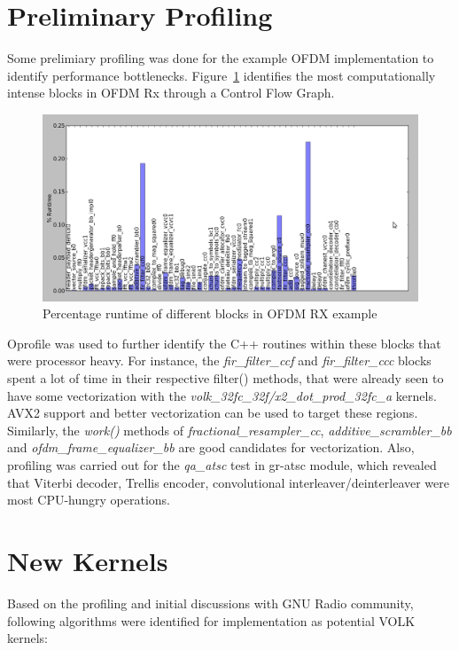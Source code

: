 \documentclass[a4paper,12pt,oneside]{article}
\begin{document}
\section{Preliminary Profiling}
\label{sec:profiling}
Some prelimiary profiling was done for the example OFDM implementation to identify performance bottlenecks. Figure~\ref{fig:1} identifies the most computationally intense blocks in OFDM Rx through a Control Flow Graph. 

\begin{figure}[h] 
\centering\includegraphics[width=5in]{figure/ofdm_rx.png}
\caption{Percentage runtime of different blocks in OFDM RX example \label{fig:1} }
\end{figure}

Oprofile \cite{oprofile} was used to further identify the C++ routines within these blocks that were processor heavy. For instance, the {\it fir\_filter\_ccf} and {\it fir\_filter\_ccc} blocks spent a lot of time in their respective filter() methods, that were already seen to have some vectorization with the {\it volk\_32fc\_32f/x2\_dot\_prod\_32fc\_a} kernels. AVX2 support and better vectorization can be used to target these regions. Similarly, the {\it work()} methods of {\it fractional\_resampler\_cc}, {\it additive\_scrambler\_bb} and {\it ofdm\_frame\_equalizer\_bb} are good candidates for vectorization. Also, profiling was carried out for the {\it qa\_atsc} test in gr-atsc module, which revealed that Viterbi decoder, Trellis encoder, convolutional interleaver/deinterleaver were most CPU-hungry operations.

\section{New Kernels}

Based on the profiling and initial discussions with GNU Radio community, following algorithms were identified for implementation as potential VOLK kernels:
\end{document}
